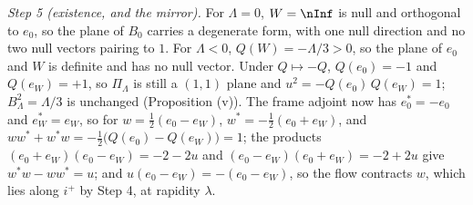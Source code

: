 \emph{Step 5 (existence, and the mirror).} For $\Lambda = 0$, $W = \nInf$ is null and orthogonal to $e_{0}$, so the plane of $B_{0}$ carries a degenerate form, with one null direction and no two null vectors pairing to $1$. For $\Lambda < 0$, $Q(W) = -\Lambda/3 > 0$, so the plane of $e_{0}$ and $W$ is definite and has no null vector. Under $Q \mapsto -Q$, $Q(e_{0}) = -1$ and $Q(e_{W}) = +1$, so $\Pi_{\Lambda}$ is still a $(1,1)$ plane and $u^{2} = -Q(e_{0})\,Q(e_{W}) = 1$; $B_{\Lambda}^{2} = \Lambda/3$ is unchanged (Proposition (v)). The frame adjoint now has $e_{0}^{*} = -e_{0}$ and $e_{W}^{*} = e_{W}$, so for $w = \tfrac12(e_{0} - e_{W})$, $w^{*} = -\tfrac12(e_{0} + e_{W})$, and $ww^{*} + w^{*}w = -\tfrac12\bigl(Q(e_{0}) - Q(e_{W})\bigr) = 1$; the products $(e_{0} + e_{W})(e_{0} - e_{W}) = -2 - 2u$ and $(e_{0} - e_{W})(e_{0} + e_{W}) = -2 + 2u$ give $w^{*}w - ww^{*} = u$; and $u(e_{0} - e_{W}) = -(e_{0} - e_{W})$, so the flow contracts $w$, which lies along $i^{+}$ by Step 4, at rapidity $\lambda$.
